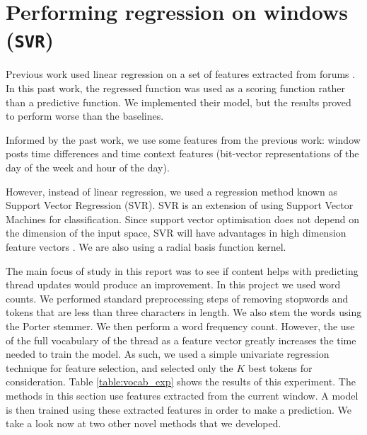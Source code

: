 \section{Performing regression on windows (\texttt{SVR})}
Previous work used linear regression on a set of features extracted from forums 
\cite{Yang2009}. In this past work, the regressed function 
was used as a scoring function rather than a predictive function. We implemented 
their model, but the results proved to perform worse than the baselines.

Informed by the past work, we use some features from the previous work: window 
posts time differences and time context features (bit-vector representations of 
the day of the week and hour of the day).

However, instead of linear regression, we used a regression method known as 
Support Vector Regression (SVR). SVR is an extension of using Support Vector 
Machines for classification. Since support vector optimisation does not depend 
on the dimension of the input space, SVR will have advantages in high dimension 
feature vectors \cite{drucker1997}. We are also using a radial basis function 
kernel.

The main focus of study in this report was to see if content helps with 
predicting thread updates would produce an improvement. In this project we used 
word counts. We performed standard preprocessing steps of removing stopwords and 
tokens that are less than three characters in length. We also stem the words 
using the Porter stemmer.
We then perform a word frequency count. However, the use 
of the full vocabulary of the thread as a feature vector greatly increases the 
time needed to train the model.
 As such, we used a simple univariate regression 
technique for feature selection, and selected only the $K$ best tokens for 
consideration. Table \ref{table:vocab_exp} shows the results of this experiment.  
The methods in this section use features extracted from the current window. A 
model is then trained using these extracted features in order to make a 
prediction. We take a look now at two other novel methods that we developed.


